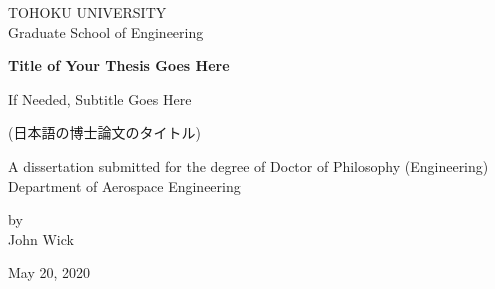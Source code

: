 \begin{titlepage}

\begin{center}
\normalsize TOHOKU UNIVERSITY \\
\vspace*{4mm}
Graduate School of Engineering\\

\vspace*{35mm} %
\begin{Large}
\textbf{Title of Your Thesis Goes Here} \\
\end{Large}
\begin{Large}
If Needed, Subtitle Goes Here\\
\end{Large}
\vspace*{5mm}
\begin{CJK*}{UTF8}{goth}
(日本語の博士論文のタイトル)\\
\end{CJK*}
\vspace*{35mm} 
\begin{large}
A dissertation submitted for the degree of Doctor of Philosophy (Engineering) \\
\vspace*{5mm}
Department of Aerospace Engineering\\
\end{large}
\vspace*{15mm} 

\begin{large}
by\\
\vspace{3mm}
John Wick \\
\vspace*{15mm} 

May 20, 2020
\date{}
\end{large}

\end{center}
\end{titlepage}
\thispagestyle{empty} %

